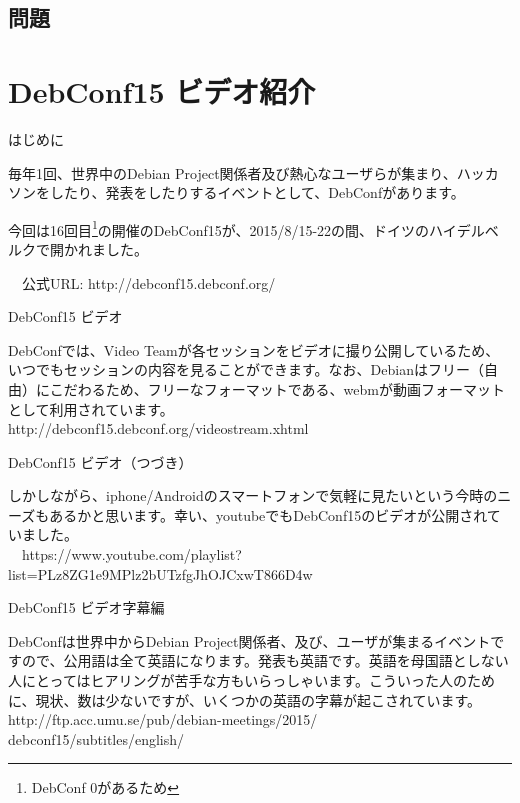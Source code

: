 \subsection{問題}

% 

\section{DebConf15 ビデオ紹介}

\begin{frame}{はじめに}

  毎年1回、世界中のDebian Project関係者及び熱心なユーザらが集まり、ハッカソンをしたり、発表をしたりするイベントとして、DebConfがあります。

  今回は16回目\footnote{DebConf 0があるため}の開催のDebConf15が、2015/8/15-22の間、ドイツのハイデルベルクで開かれました。

　公式URL: http://debconf15.debconf.org/
  
\end{frame}

\begin{frame}{DebConf15 ビデオ}

  DebConfでは、Video Teamが各セッションをビデオに撮り公開しているため、いつでもセッションの内容を見ることができます。なお、Debianはフリー（自由）にこだわるため、フリーなフォーマットである、webmが動画フォーマットとして利用されています。\\

  http://debconf15.debconf.org/videostream.xhtml

\end{frame}

\begin{frame}{DebConf15 ビデオ（つづき）}

  しかしながら、iphone/Androidのスマートフォンで気軽に見たいという今時のニーズもあるかと思います。幸い、youtubeでもDebConf15のビデオが公開されていました。\\

  　https://www.youtube.com/playlist?\\
      list=PLz8ZG1e9MPlz2bUTzfgJhOJCxwT866D4w
  
\end{frame}

\begin{frame}{DebConf15 ビデオ字幕編}

  DebConfは世界中からDebian Project関係者、及び、ユーザが集まるイベントですので、公用語は全て英語になります。発表も英語です。英語を母国語としない人にとってはヒアリングが苦手な方もいらっしゃいます。こういった人のために、現状、数は少ないですが、いくつかの英語の字幕が起こされています。\\

  http://ftp.acc.umu.se/pub/debian-meetings/2015/\\
    debconf15/subtitles/english/    

\end{frame}

